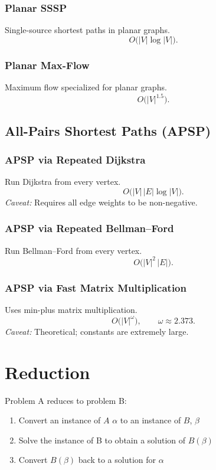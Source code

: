 \documentclass[9pt]{extarticle}
\begin{document}
\subsubsection{Planar SSSP}
Single-source shortest paths in planar graphs.
\[
O\bigl(|V| \log |V|\bigr).
\]

\subsubsection{Planar Max-Flow}
Maximum flow specialized for planar graphs.
\[
O\bigl(|V|^{1.5}\bigr).
\]

\subsection{All-Pairs Shortest Paths (APSP)}

\subsubsection{APSP via Repeated Dijkstra}
Run Dijkstra from every vertex.
\[
O\bigl(|V| \, |E| \log |V|\bigr).
\]
\emph{Caveat:} Requires all edge weights to be non-negative.

\subsubsection{APSP via Repeated Bellman--Ford}
Run Bellman--Ford from every vertex.
\[
O\bigl(|V|^{2} \, |E|\bigr).
\]

\subsubsection{APSP via Fast Matrix Multiplication}
Uses min-plus matrix multiplication.
\[
O\bigl(|V|^{\omega}\bigr),
\qquad \omega \approx 2.373.
\]
\emph{Caveat:} Theoretical; constants are extremely large.

\section{Reduction}
Problem A reduces to problem B: 
\begin{enumerate}
  \item Convert an instance of $A$ $\alpha$ to an instance of $B$, $\beta$
  \item Solve the instance of B to obtain a solution of $B(\beta)$
  \item Convert $B(\beta)$ back to a solution for $\alpha$
\end{enumerate}
\end{document}
